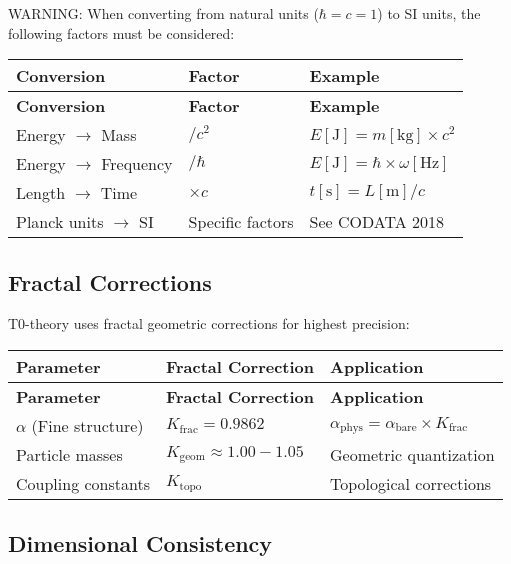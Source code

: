 \documentclass[12pt,a4paper]{article}
\begin{document}
	WARNING: When converting from natural units (\(\hbar = c = 1\)) to SI units, the following factors must be considered:
	
	\begin{longtable}{|p{3cm}|p{3cm}|p{6cm}|}
		\hline
		\textbf{Conversion} & \textbf{Factor} & \textbf{Example} \\
		\hline
		\endfirsthead
		\hline
		\textbf{Conversion} & \textbf{Factor} & \textbf{Example} \\
		\hline
		\endhead
		Energy \(\rightarrow\) Mass & \(/c^{2}\) & \(E[\text{J}] = m[\text{kg}] \times c^{2}\) \\
		\hline
		Energy \(\rightarrow\) Frequency & \(/\hbar\) & \(E[\text{J}] = \hbar \times \omega[\text{Hz}]\) \\
		\hline
		Length \(\rightarrow\) Time & \(\times c\) & \(t[\text{s}] = L[\text{m}]/c\) \\
		\hline
		Planck units \(\rightarrow\) SI & Specific factors & See CODATA 2018 \\
		\hline
	\end{longtable}
	
	\subsection{Fractal Corrections}
	
	T0-theory uses fractal geometric corrections for highest precision:
	
	\begin{longtable}{|p{4cm}|p{4cm}|p{5cm}|}
		\hline
		\textbf{Parameter} & \textbf{Fractal Correction} & \textbf{Application} \\
		\hline
		\endfirsthead
		\hline
		\textbf{Parameter} & \textbf{Fractal Correction} & \textbf{Application} \\
		\hline
		\endhead
		\(\alpha\) (Fine structure) & \(K_{\text{frac}} = 0.9862\) & \(\alpha_{\text{phys}} = \alpha_{\text{bare}} \times K_{\text{frac}}\) \\
		\hline
		Particle masses & \(K_{\text{geom}} \approx 1.00-1.05\) & Geometric quantization \\
		\hline
		Coupling constants & \(K_{\text{topo}}\) & Topological corrections \\
		\hline
	\end{longtable}
	
	\subsection{Dimensional Consistency}
	
\end{document}
